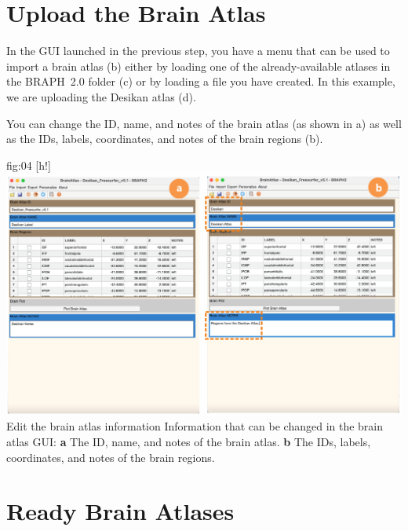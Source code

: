 \documentclass[justified]{tufte-handout}
\begin{document}
\clearpage
\section{Upload the Brain Atlas}

In the GUI launched in the previous step, you have a menu that can be used to import a brain atlas (b) either by loading one of the already-available atlases in the BRAPH~2.0 folder  (c) or by loading a file you have created. In this example, we are uploading the Desikan atlas (d).

You can change the ID, name, and notes of the brain atlas (as shown in a) as well as the IDs, labels, coordinates, and notes of the brain regions (b).
	
	{fig:04}
	{
	[h!]
	\includegraphics{tut_ba/fig04.png}
	}
	{Edit the brain atlas information}
	{
	Information that can be changed in the brain atlas GUI: 
	{\bf a} The ID, name, and notes of the brain atlas.
	{\bf b} The IDs, labels, coordinates, and notes of the brain regions.
	}

\section{Ready Brain Atlases}
\end{document}
